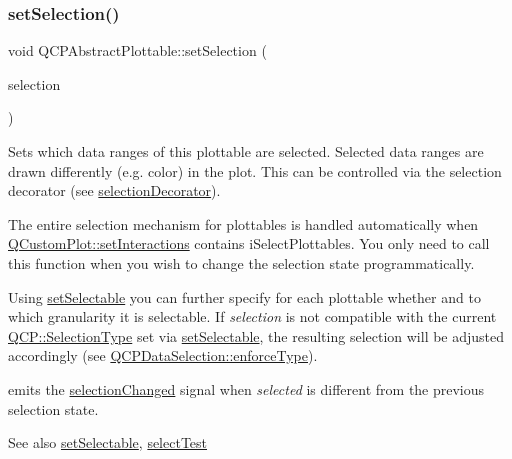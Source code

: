 \subsubsection{\texorpdfstring{set\+Selection()}{setSelection()}}
{\footnotesize\ttfamily void Q\+C\+P\+Abstract\+Plottable\+::set\+Selection (\begin{DoxyParamCaption}\item[{\hyperlink{classQCPDataSelection}{Q\+C\+P\+Data\+Selection}}]{selection }\end{DoxyParamCaption})}

Sets which data ranges of this plottable are selected. Selected data ranges are drawn differently (e.\+g. color) in the plot. This can be controlled via the selection decorator (see \hyperlink{classQCPAbstractPlottable_a7861518e47ca0c6a0c386032c2db075e}{selection\+Decorator}).

The entire selection mechanism for plottables is handled automatically when \hyperlink{classQCustomPlot_a5ee1e2f6ae27419deca53e75907c27e5}{Q\+Custom\+Plot\+::set\+Interactions} contains i\+Select\+Plottables. You only need to call this function when you wish to change the selection state programmatically.

Using \hyperlink{classQCPAbstractPlottable_ac238d6e910f976f1f30d41c2bca44ac3}{set\+Selectable} you can further specify for each plottable whether and to which granularity it is selectable. If {\itshape selection} is not compatible with the current \hyperlink{namespaceQCP_ac6cb9db26a564b27feda362a438db038}{Q\+C\+P\+::\+Selection\+Type} set via \hyperlink{classQCPAbstractPlottable_ac238d6e910f976f1f30d41c2bca44ac3}{set\+Selectable}, the resulting selection will be adjusted accordingly (see \hyperlink{classQCPDataSelection_a17b84d852911531d229f4a76aa239a75}{Q\+C\+P\+Data\+Selection\+::enforce\+Type}).

emits the \hyperlink{classQCPAbstractPlottable_a3af66432b1dca93b28e00e78a8c7c1d9}{selection\+Changed} signal when {\itshape selected} is different from the previous selection state.

\begin{DoxySeeAlso}{See also}
\hyperlink{classQCPAbstractPlottable_ac238d6e910f976f1f30d41c2bca44ac3}{set\+Selectable}, \hyperlink{classQCPAbstractPlottable_addb3f5c41f007a78c3e142cc605bc712}{select\+Test} 
\end{DoxySeeAlso}
\mbox{\label{classQCPAbstractPlottable_a20e266ad646f8c4a7e4631040510e5d9}} 
